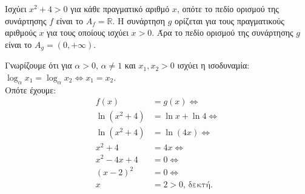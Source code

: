 \begin{alist}
\item Ισχύει $x^2 + 4 > 0$ για κάθε πραγματικό αριθμό $x$, οπότε το πεδίο ορισμού της συνάρτησης $f$ είναι το $A_f = \mathbb{R}$. Η συνάρτηση $g$ ορίζεται για τους πραγματικούς αριθμούς $x$ για τους οποίους ισχύει $x > 0$. Άρα το πεδίο ορισμού της συνάρτησης $g$ είναι το $A_g = (0, +\infty)$.
\item Γνωρίζουμε ότι για $\alpha > 0$, $\alpha \neq 1$ και $x_1, x_2 > 0$ ισχύει η ισοδυναμία: $\log_\alpha x_1 = \log_\alpha x_2 \Leftrightarrow x_1 = x_2$. \\
Οπότε έχουμε:
\begin{align*}
f(x) &= g(x) \Leftrightarrow \\
\ln(x^2 + 4) &= \ln x + \ln 4 \Leftrightarrow \\
\ln(x^2 + 4) &= \ln(4x) \Leftrightarrow \\
x^2 + 4 &= 4x \Leftrightarrow \\
x^2 - 4x + 4 &= 0 \Leftrightarrow \\
(x - 2)^2 &= 0 \Leftrightarrow \\
x &= 2 > 0 \text{, δεκτή.}
\end{align*}
\end{alist}

